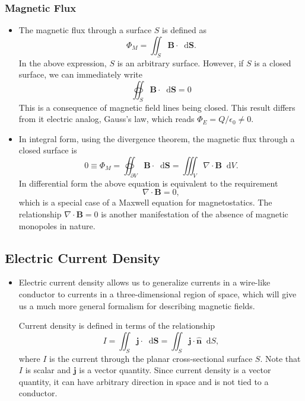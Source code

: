 \documentclass[11pt, a4paper]{article}
\newcommand{\diff}{\mathop{}\!\mathrm{d}} %
\renewcommand{\vec}[1]{\bm{#1}} %
\newcommand{\uvec}[1]{\hat{\vec{#1}}} %
\newcommand{\B}{\vec{B}} %
\newcommand{\ee}{\epsilon_{0}}  %
\renewcommand{\div}{\nabla \cdot}
\begin{document}
\subsubsection{Magnetic Flux}
\begin{itemize}
	\item The magnetic flux through a surface $ S $ is defined as
	\begin{equation*}
		\Phi_{M} = \iint_{S} \B \cdot \diff \vec{S}.
	\end{equation*}
	In the above expression, $ S $ is an arbitrary surface. However, if $ S $ is a closed surface, we can immediately write
	\begin{equation*}
	 	\oiint_{S} \B \cdot \diff \vec{S} = 0
	\end{equation*}
	This is a consequence of magnetic field lines being closed. This result differs from it electric analog, Gauss's law, which reads $ \Phi_{E} = Q/\ee \neq 0 $.
	
	\item In integral form, using the divergence theorem, the magnetic flux through a closed surface is
	\begin{equation*}
		0 \equiv \Phi_{M} = \oiint_{\partial V} \B \cdot \diff \vec{S} = \iiint_{V} \div \B \diff V.
	\end{equation*}
	In differential form the above equation is equivalent to the requirement
	\begin{equation*}
		\div \B = 0,
	\end{equation*}
    which is a special case of a Maxwell equation for magnetostatics. The relationship $ \div \B = 0 $ is another manifestation of the absence of magnetic monopoles in nature.
	
\end{itemize}

\subsection{Electric Current Density}
\begin{itemize}
	\item Electric current density allows us to generalize currents in a wire-like conductor to currents in a three-dimensional region of space, which will give us a much more general formalism for describing magnetic fields.
	
    Current density is defined in terms of the relationship
	\begin{equation*}
		I = \iint_{S} \vec{j} \cdot \diff \vec{S} = \iint_{S} \vec{j} \cdot \uvec{n} \diff S,
	\end{equation*}
    where $ I $ is the current through the planar cross-sectional surface $ S $. Note that $ I $ is scalar and $ \vec{j} $ is a vector quantity. Since current density is a vector quantity, it can have arbitrary direction in space and is not tied to a conductor. 
	
\end{itemize}
\end{document}
